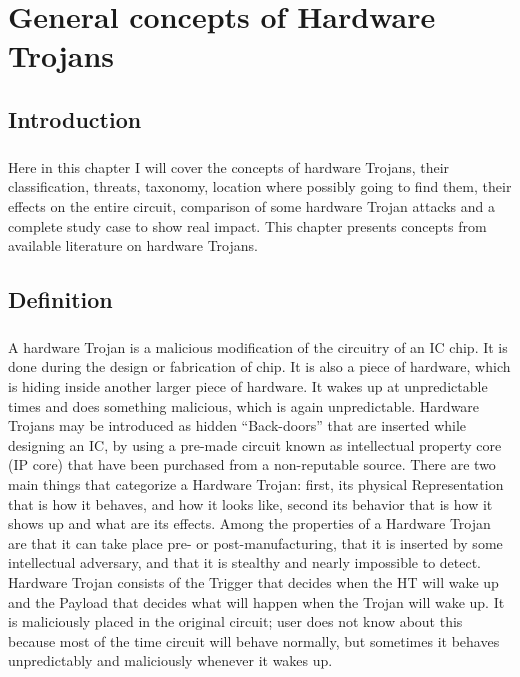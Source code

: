 \chapter{General concepts of Hardware Trojans}
\section{Introduction}
\paragraph*{}
Here in this chapter I will cover the concepts of hardware Trojans, their classification, threats, taxonomy, location where possibly going to find them, their effects on the entire circuit, comparison of some hardware Trojan attacks and a complete study case to show real impact. This chapter presents concepts from available literature on hardware Trojans.
\section{Definition}
\paragraph*{}
A hardware Trojan is a malicious modification of the circuitry of an IC chip. It is done during the design or fabrication of chip. It is also a piece of hardware, which is hiding inside another larger piece of hardware. It wakes up at unpredictable times and does something malicious, which is again unpredictable. Hardware Trojans may be introduced as hidden “Back-doors” that are inserted while designing an IC, by using a pre-made circuit known as intellectual property core (IP core) that have been purchased from a non-reputable source. There are two main things that categorize a Hardware Trojan: first, its physical Representation that is how it behaves, and how it looks like, second its behavior that is how it shows up and what are its effects. Among the properties of a Hardware Trojan are that it can take place pre- or post-manufacturing, that it is inserted by some intellectual adversary, and that it is stealthy and nearly impossible to detect. Hardware Trojan consists of the Trigger that decides when the HT will wake up and the Payload that decides what will happen when the Trojan will wake up. It is maliciously placed in the original circuit; user does not know about this because most of the time circuit will behave normally, but sometimes it behaves unpredictably and maliciously whenever it wakes up.
